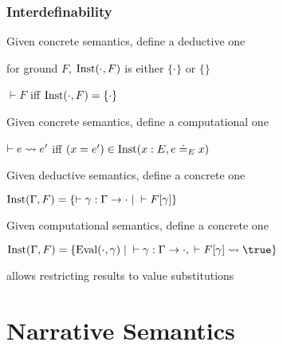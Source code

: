 \begin{frame}\frametitle{Interdefinability}
\begin{blockitems}{Given concrete semantics, define a deductive one}
\item for ground $F$, $\mathrm{Inst}(\cdot,F)$ is either $\{\cdot\}$ or $\{\}$
\item $\vdash F$ iff $\mathrm{Inst}(\cdot, F)=\{\cdot\}$
\end{blockitems}

\begin{blockitems}{Given concrete semantics, define a computational one}
\item $\vdash e\rightsquigarrow e'$ iff $(x=e')\in\mathrm{Inst}(x:E, e\doteq_E x)$
\end{blockitems}

\begin{blockitems}{Given deductive semantics, define a concrete one}
\item $\mathrm{Inst}(\Gamma,F)=\{\vdash \gamma:\Gamma\to\cdot \;|\;\vdash F[\gamma]\}$
\end{blockitems}

\begin{blockitems}{Given computational semantics, define a concrete one}
\item $\Inst(\Gamma,F)=\{\Eval(\cdot,\gamma) \;|\;\vdash \gamma:\Gamma\to\cdot, \;\vdash F[\gamma]\rewrites \true\}$
\item allows restricting results to value substitutions
\end{blockitems}
\end{frame}

\section{Narrative Semantics}

